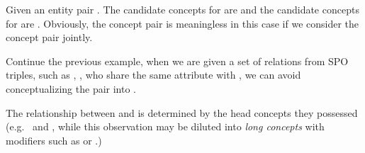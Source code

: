 {\footnotesize

\begin{example}
Given an entity pair . 
The candidate concepts for  are  and the candidate concepts for  are . 
Obviously, the concept pair  is meaningless in this case if we consider the concept pair jointly.
\label{exa:jc}
\end{example}


\begin{example}
Continue the previous example, when we are given a set of relations from SPO triples, such as , , who share the same attribute  with , we can 
avoid conceptualizing the pair into
.
\label{exa:sd}
\end{example}

\begin{example}
The  relationship between  and  is determined by the head concepts they possessed (e.g.\  and , while this observation may be diluted into \emph{long concepts} with  modifiers such as  or .)
\label{exa:hc}
\end{example}

}




